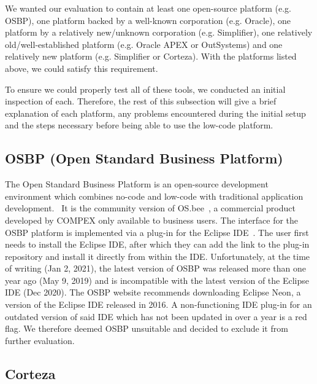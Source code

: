 \documentclass[runningheads]{llncs}
\begin{document}
We wanted our evaluation to contain at least one open-source platform (e.g. OSBP), one platform backed by a well-known corporation (e.g. Oracle), one platform by a relatively new/unknown corporation (e.g. Simplifier), one relatively old/well-established platform (e.g. Oracle APEX or OutSystems) and one relatively new platform (e.g. Simplifier or Corteza). With the platforms listed above, we could satisfy this requirement.

To ensure we could properly test all of these tools, we conducted an initial inspection of each. Therefore, the rest of this subsection will give a brief explanation of each platform, any problems encountered during the initial setup and the steps necessary before being able to use the low-code platform.

\subsection{OSBP (Open Standard Business Platform)}

The Open Standard Business Platform is an open-source development environment which combines no-code and low-code with traditional application development.~\cite{osbp} It is the community version of OS.bee~\cite{osbee}, a commercial product developed by COMPEX only available to business users. The interface for the OSBP platform is implemented via a plug-in for the Eclipse IDE~\cite{eclipse_ide}. The user first needs to install the Eclipse IDE, after which they can add the link to the plug-in repository and install it directly from within the IDE. Unfortunately, at the time of writing (Jan 2, 2021), the latest version of OSBP was released more than one year ago (May 9, 2019) and is incompatible with the latest version of the Eclipse IDE (Dec 2020). The OSBP website recommends downloading Eclipse Neon, a version of the Eclipse IDE released in 2016. A non-functioning IDE plug-in for an outdated version of said IDE which has not been updated in over a year is a red flag. We therefore deemed OSBP unsuitable and decided to exclude it from further evaluation.

\subsection{Corteza}
\end{document}
